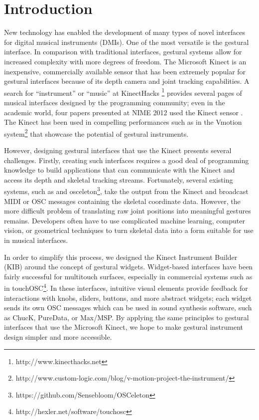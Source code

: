 \documentclass{nime-alternate}
\begin{document}
\section{Introduction}
New technology has enabled the development of many types of novel interfaces for digital
musical instruments (DMIs). One of the most versatile is the gestural interface. In comparison
with traditional interfaces, gestural systems allow for increased complexity with more degrees
of freedom. The Microsoft Kinect is an inexpensive, commercially available sensor that has been
extremely popular for gestural interfaces because of its depth camera and joint tracking
capabilities. A search for ``instrument'' or ``music'' at KinectHacks
\footnote{http://www.kinecthacks.net} provides
several pages of musical interfaces designed by the programming community; even in the
academic world, four papers presented at NIME 2012 used the Kinect sensor \cite{nimekinect1, nimekinect2, nimekinect3, digito}. The Kinect has been used in compelling performances
such as in the Vmotion system\footnote{http://www.custom-logic.com/blog/v-motion-project-the-instrument/} that showcase the potential of gestural instruments.

However, designing gestural interfaces that use the Kinect presents several challenges. 
Firstly, creating such interfaces requires a good deal of programming knowledge to build
applications that can communicate with the Kinect and access its depth and skeletal tracking streams. 
Fortunately, several existing systems, such as \cite{yoo2011creating} and osceleton\footnote{https://github.com/Sensebloom/OSCeleton}, take the output from
the Kinect and broadcast MIDI or OSC messages containing the skeletal coordinate data. However,
the more difficult problem of translating raw joint positions into meaningful gestures remains.
Developers often have to use complicated machine learning, computer vision, or geometrical
techniques to turn skeletal data into a form suitable for use in musical interfaces. 

In order to simplify this process, we designed the Kinect Instrument Builder (KIB) around the
concept of gestural widgets. Widget-based interfaces have been fairly successful for multitouch
surfaces, especially in commercial systems such as in touchOSC\footnote{http://hexler.net/software/touchosc}. In these interfaces, intuitive visual elements provide feedback for interactions
with knobs, sliders, buttons, and more abstract widgets; each widget sends its own OSC messages
which can be used in sound synthesis software, such as ChucK, PureData, or Max/MSP. By applying
the same principles to gestural interfaces that use the Microsoft Kinect, we hope to make gestural
instrument design simpler and more accessible. 
\end{document}

